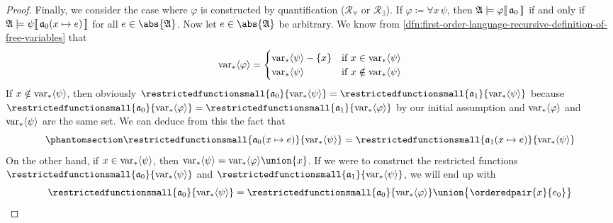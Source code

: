 \begin{proof}
    \vspace{0.3cm}
    \noindent
    Finally, we consider the case where \( \varphi \) is constructed by quantification (\( \mathcal{R}_{\forall} \) or \( \mathcal{R}_{\exists} \)).
    If \( \varphi \coloneq \forall x \, \psi \), then \(  \mathfrak{A} \models \varphi\llbracket\, \mathfrak{a}_{0} \,\rrbracket \) if and only if
    \( \folwffsatisfaction{\mathfrak{A}}{\psi}{ \folmodifiedvariableassignmentfunction{\mathfrak{a}_{0}}{x}{e} } \) for all \( e \in \abs{\mathfrak{A}} \).
    Now let \( e \in \abs{\mathfrak{A}} \) be arbitrary.
    We know from \cref{dfn:first-order-language-recursive-definition-of-free-variables} that
    \begin{equation*}
        \folfreevars{\varphi} =
        \begin{cases}
            \folfreevars{\psi} - \mleft\{ x \mright\} & \text{\normalfont if }  x \in \folfreevars{\psi} \\
            \folfreevars{\psi} & \text{\normalfont if } x \notin \folfreevars{\psi}
        \end{cases}
    \end{equation*}
    If \( x \notin \operatorname{var}_{\ast} \langle\psi\rangle \), then obviously \( \restrictedfunctionsmall{\mathfrak{a}_{0}}{ \folfreevars{\psi} } = \restrictedfunctionsmall{\mathfrak{a}_{1}}{ \folfreevars{\psi} }  \) because \( \restrictedfunctionsmall{\mathfrak{a}_{0}}{ \folfreevars{\varphi} } = \restrictedfunctionsmall{\mathfrak{a}_{1}}{ \folfreevars{\varphi} } \) by our initial assumption
    and \( \operatorname{var}_{\ast} \langle\varphi\rangle \) and \( \operatorname{var}_{\ast} \langle\psi\rangle \) are the same set.
    We can deduce from this the fact that
    \begin{equation}
        \phantomsection \label{eq:modified-variable-assignment-function-also-agree}
        \restrictedfunctionsmall{ \folmodifiedvariableassignmentfunction{\mathfrak{a}_{0}}{x}{e} }{ \folfreevars{\psi} }
        =
        \restrictedfunctionsmall{ \folmodifiedvariableassignmentfunction{\mathfrak{a}_{1}}{x}{e} }{ \folfreevars{\psi} }
    \end{equation} 
    \noindent
    On the other hand, if \( x \in \operatorname{var}_{\ast} \langle\psi\rangle \), then \( \folfreevars{\psi} = \folfreevars{\varphi} \union \mleft\{ x \mright\} \).
    If we were to construct the restricted functions \( \restrictedfunctionsmall{\mathfrak{a}_{0}}{\folfreevars{\psi}} \)
    and \( \restrictedfunctionsmall{\mathfrak{a}_{1}}{\folfreevars{\psi}} \), we will end up with
    \begin{align*}
        \restrictedfunctionsmall{\mathfrak{a}_{0}}{\folfreevars{\psi}} = \restrictedfunctionsmall{\mathfrak{a}_{0}}{\folfreevars{\varphi}} \union \big\{ \orderedpair{x}{e_{0}} \big\}\\

\end{align*}
\end{proof}
